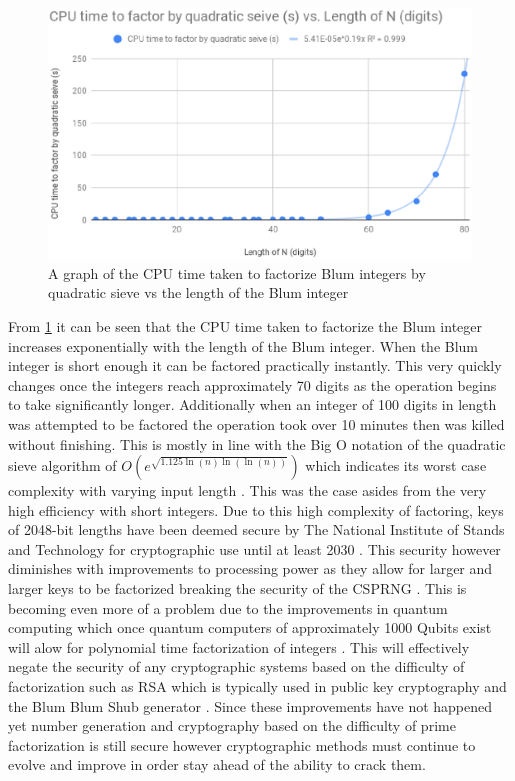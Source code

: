 \documentclass{article}
\begin{document}
\begin{figure}
    \includegraphics[scale=0.5]{graph1.eps}
    \caption{A graph of the CPU time taken to factorize Blum integers by quadratic sieve vs the length of the Blum integer}
    \label{fig:graph1}
\end{figure}

From \ref{fig:graph1} it can be seen that the CPU time taken to factorize the Blum integer increases exponentially with the length of the Blum integer. When the Blum integer is short enough it can be factored practically instantly. This very quickly changes once the integers reach approximately 70 digits as the operation begins to take significantly longer. Additionally when an integer of 100 digits in length was attempted to be factored the operation took over 10 minutes then was killed without finishing. This is mostly in line with the Big O notation of the quadratic sieve algorithm of $O(e^{\sqrt{1.125\ln(n)\ln(\ln(n))}})$ which indicates its worst case complexity with varying input length \cite{Landquist2001}. This was the case asides from the very high efficiency with short integers. Due to this high complexity of factoring, keys of 2048-bit lengths have been deemed secure by The National Institute of Stands and Technology for cryptographic use until at least 2030 \cite{Thayer2020}. This security however diminishes with improvements to processing power as they allow for larger and larger keys to be factorized breaking the security of the CSPRNG \cite{Landquist2001}. This is becoming even more of a problem due to the improvements in quantum computing which once quantum computers of approximately 1000 Qubits exist will alow for polynomial time factorization of integers \cite{Landquist2001}. This will effectively negate the security of any cryptographic systems based on the difficulty of factorization such as RSA which is typically used in public key cryptography and the Blum Blum Shub generator \cite{Landquist2001}. Since these improvements have not happened yet number generation and cryptography based on the difficulty of prime factorization is still secure however cryptographic methods must continue to evolve and improve in order stay ahead of the ability to crack them.
\end{document}
